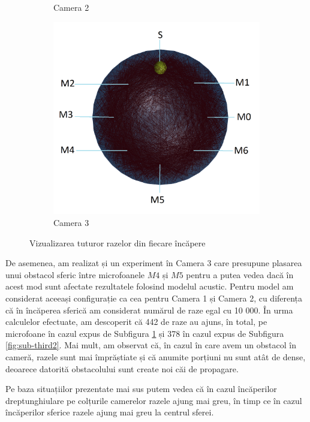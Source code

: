 \begin{figure}[!htb]
\begin{subfigure}[b]{.3\textwidth}
			\caption{Camera 2}
		\end{subfigure}
		\hfill
		\begin{subfigure}[b]{.3\textwidth}
			\centering
			\includegraphics[width=1\linewidth]{imagini/roomC_rays.png}
			\caption{Camera 3}
			\label{fig:sub-third}
		\end{subfigure}
		
		\caption{Vizualizarea tuturor razelor din fiecare încăpere}
		\label{fig:Fig21}
	\end{figure}

	De asemenea, am realizat și un experiment în Camera 3 care presupune plasarea unui obstacol sferic între microfoanele $M4$ și $M5$ pentru a putea vedea dacă în acest mod sunt afectate rezultatele folosind modelul acustic. Pentru model am considerat aceeași configurație ca cea pentru Camera 1 și Camera 2, cu diferența că în încăperea sferică am considerat numărul de raze egal cu 10 000. În urma calculelor efectuate, am descoperit că 442 de raze au ajuns, în total, pe microfoane în cazul expus de Subfigura \ref{fig:sub-third} și
	378 în cazul expus de Subfigura \ref{fig:sub-third2}. Mai mult, am observat că, în cazul în care avem un obstacol în cameră, razele sunt
	mai împrăștiate și că anumite porțiuni nu sunt atât de dense, deoarece datorită obstacolului sunt create noi căi de propagare.
	
	Pe baza situațiilor prezentate mai sus putem vedea că în cazul încăperilor dreptunghiulare pe colțurile camerelor razele ajung mai greu, în timp ce în cazul încăperilor sferice razele ajung mai greu la centrul sferei.
	
